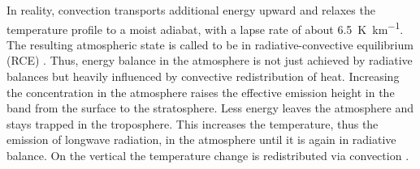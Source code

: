 In reality, convection transports additional energy upward and relaxes the temperature profile to a moist adiabat, with a lapse rate of about \SI{6.5}{\K\per\km}. The resulting atmospheric state is called to be in radiative-convective equilibrium (RCE) \parencite{manabeThermalEquilibriumAtmosphere1964}. Thus, energy balance in the atmosphere is not just achieved by radiative balances but heavily influenced by convective redistribution of heat. Increasing the \CO concentration in the atmosphere raises the effective emission height in the \CO band from the surface to the stratosphere. Less energy leaves the atmosphere and stays trapped in the troposphere. This increases the temperature, thus the emission of longwave radiation, in the atmosphere until it is again in radiative balance. On the vertical the temperature change is redistributed via convection \parencite{jeevanjeeClimateSensitivityRadiativeconvective2023}. 

